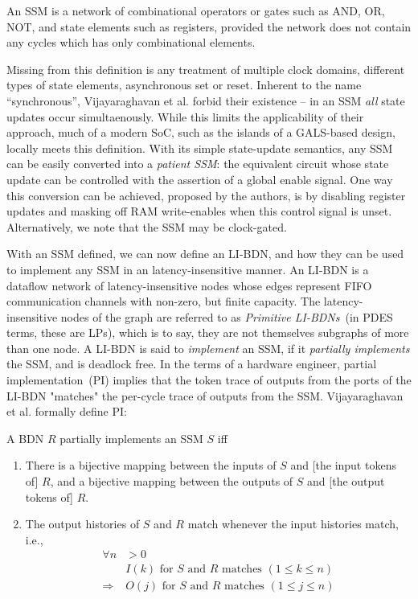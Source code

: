 \begin{widequote}
An SSM is a network of combinational operators or gates
such as AND, OR, NOT, and state elements such as registers,
provided the network does not contain any cycles which has
only combinational elements.
\end{widequote}

Missing from this definition is any treatment of multiple clock domains, different
types of state elements, asynchronous set or reset.  Inherent to the name
``synchronous'', Vijayaraghavan et al. forbid their existence -- in an SSM
\emph{all} state updates occur simultaenously. While this limits the
applicability of their approach, much of a modern SoC, such as the islands of a
GALS-based design, locally meets this definition.  With its simple
state-update semantics, any SSM can be easily converted into a \emph{patient
SSM}: the equivalent circuit whose state update can be controlled with the
assertion of a global enable signal.
One way this conversion can be achieved, proposed by the authors, is by
disabling register updates and masking off RAM write-enables when this control
signal is unset. Alternatively, we note that the SSM may be clock-gated.

With an SSM defined, we can now define an LI-BDN, and how they can be used to implement any
SSM in an latency-insensitive manner. An LI-BDN is a dataflow network of latency-insensitive nodes whose
edges represent FIFO communication channels with non-zero, but finite capacity. The latency-insensitive nodes of the graph are
referred to as \emph{Primitive LI-BDNs}~(in PDES terms, these are LPs), which is to say, they 
are not themselves subgraphs of more than one node. A
LI-BDN is said to \emph{implement} an SSM, if it \emph{partially implements}
the SSM, and is deadlock free. In the terms of a hardware engineer, partial implementation~(PI) implies that
the token trace of outputs from the ports of the LI-BDN "matches" the
per-cycle trace of outputs from the SSM. Vijayaraghavan et al.\cite{LIBDN}
formally define PI:

\begin{widequote}
A BDN $R$ partially implements an SSM $S$ iff
\begin{enumerate}
\item There is a bijective mapping between the inputs of $S$ and
[the input tokens of] $R$, and a bijective mapping between the outputs of $S$ and
[the output tokens of] $R$.
\item The output histories of $S$ and $R$ match whenever the
input histories match, i.e.,
\begin{align*}
\forall n &> 0\\
&\text{$I(k)$ for $S$ and $R$ matches $(1 \leq k \leq n)$}\\
\Rightarrow &\text{$O(j)$ for $S$ and $R$ matches $(1 \leq j \leq n)$}
\end{align*}
\end{enumerate}
\end{widequote}

